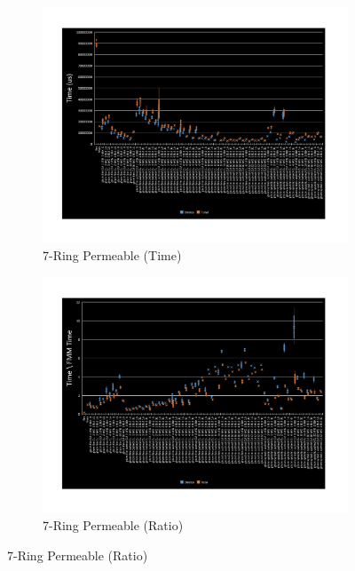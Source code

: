 \documentclass[11pt]{article}       %
\begin{document}
\begin{figure}%
	\centering
	\begin{subfigure}[b]{.4\columnwidth}
		\includegraphics[width=\textwidth]{Figures/time-7-ring-permeable}
		\caption{7-Ring Permeable (Time)}
	\end{subfigure}
	\begin{subfigure}[b]{.4\columnwidth}
		\includegraphics[width=\textwidth]{Figures/ratio-time-7-ring-permeable}
		\caption{7-Ring Permeable (Ratio)}
	\end{subfigure}
	

\end{figure}
\end{document}
